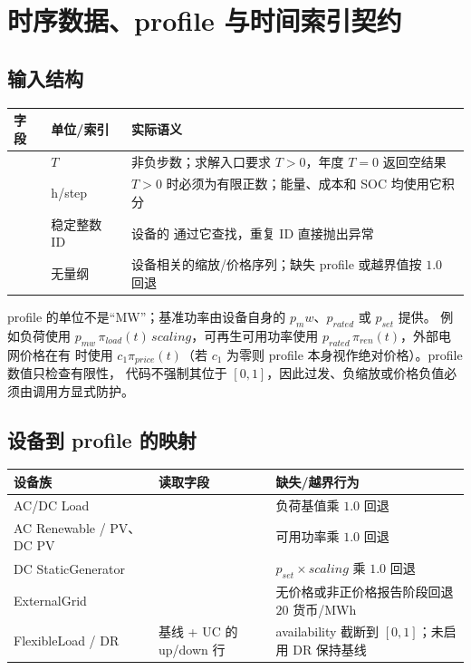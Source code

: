 \section{时序数据、profile 与时间索引契约}
\label{sec:ts-data}

\subsection{输入结构}
\begin{center}\footnotesize
\begin{tabular}{@{}L{3.6cm}L{2.0cm}L{8.4cm}@{}}
\toprule
字段 & 单位/索引 & 实际语义\\ \midrule
{} & $T$ & 非负步数；求解入口要求 $T>0$，年度 $T=0$ 返回空结果\\
 & h/step & $T>0$ 时必须为有限正数；能量、成本和 SOC 均使用它积分\\
 & 稳定整数 ID & 设备的  通过它查找，重复 ID 直接抛出异常\\
 & 无量纲 & 设备相关的缩放/价格序列；缺失 profile 或越界值按 $1.0$ 回退\\
\bottomrule
\end{tabular}
\end{center}

profile 的单位不是“MW”；基准功率由设备自身的 $p_mw$、$p_{rated}$ 或 $p_{set}$ 提供。
例如负荷使用 $p_{mw}\,\pi_{load}(t)\,scaling$，可再生可用功率使用
$p_{rated}\,\pi_{ren}(t)$，外部电网价格在有  时使用
$c_1\pi_{price}(t)$（若 $c_1$ 为零则 profile 本身视作绝对价格）。profile 数值只检查有限性，
代码不强制其位于 $[0,1]$，因此过发、负缩放或价格负值必须由调用方显式防护。

\subsection{设备到 profile 的映射}
\begin{longtable}{@{}L{4.1cm}L{4.0cm}L{5.7cm}@{}}
\toprule
设备族 & 读取字段 & 缺失/越界行为\\ \midrule
AC/DC Load &  & 负荷基值乘 $1.0$ 回退\\
AC Renewable / PV、DC PV &  & 可用功率乘 $1.0$ 回退\\
DC StaticGenerator &  & $p_{set}\times scaling$ 乘 $1.0$ 回退\\
ExternalGrid &  & 无价格或非正价格报告阶段回退 $20$ 货币/MWh\\
FlexibleLoad / DR & 基线 + UC 的 up/down 行 & availability 截断到 $[0,1]$；未启用 DR 保持基线\\
\bottomrule
\end{longtable}

